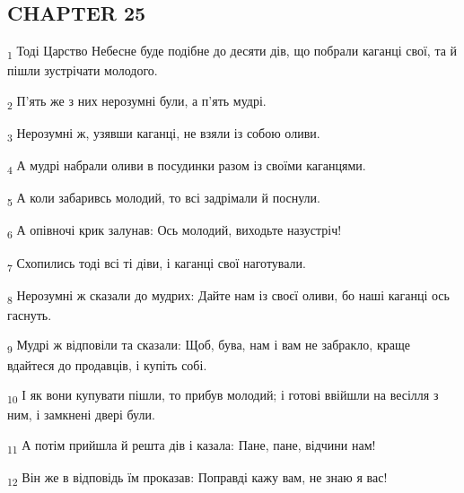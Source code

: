 \subsection{CHAPTER 25}
\begin{tcolorbox}
\textsubscript{1} Тоді Царство Небесне буде подібне до десяти дів, що побрали каганці свої, та й пішли зустрічати молодого.
\end{tcolorbox}
\begin{tcolorbox}
\textsubscript{2} П'ять же з них нерозумні були, а п'ять мудрі.
\end{tcolorbox}
\begin{tcolorbox}
\textsubscript{3} Нерозумні ж, узявши каганці, не взяли із собою оливи.
\end{tcolorbox}
\begin{tcolorbox}
\textsubscript{4} А мудрі набрали оливи в посудинки разом із своїми каганцями.
\end{tcolorbox}
\begin{tcolorbox}
\textsubscript{5} А коли забаривсь молодий, то всі задрімали й поснули.
\end{tcolorbox}
\begin{tcolorbox}
\textsubscript{6} А опівночі крик залунав: Ось молодий, виходьте назустріч!
\end{tcolorbox}
\begin{tcolorbox}
\textsubscript{7} Схопились тоді всі ті діви, і каганці свої наготували.
\end{tcolorbox}
\begin{tcolorbox}
\textsubscript{8} Нерозумні ж сказали до мудрих: Дайте нам із своєї оливи, бо наші каганці ось гаснуть.
\end{tcolorbox}
\begin{tcolorbox}
\textsubscript{9} Мудрі ж відповіли та сказали: Щоб, бува, нам і вам не забракло, краще вдайтеся до продавців, і купіть собі.
\end{tcolorbox}
\begin{tcolorbox}
\textsubscript{10} І як вони купувати пішли, то прибув молодий; і готові ввійшли на весілля з ним, і замкнені двері були.
\end{tcolorbox}
\begin{tcolorbox}
\textsubscript{11} А потім прийшла й решта дів і казала: Пане, пане, відчини нам!
\end{tcolorbox}
\begin{tcolorbox}
\textsubscript{12} Він же в відповідь їм проказав: Поправді кажу вам, не знаю я вас!
\end{tcolorbox}
